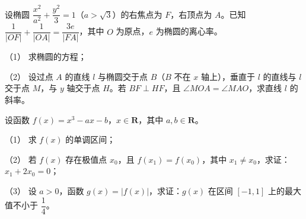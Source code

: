 \begin{question}
设椭圆 \(\dfrac{x^{2}}{a^{2}}+\dfrac{y^{2}}{3}=1\)（\(a>\sqrt{3}\)）的右焦点为 \(F\)，右顶点为 \(A\)。已知 \(\dfrac{1}{|OF|}+\dfrac{1}{|OA|}=\dfrac{3e}{|FA|}\)，其中 \(O\) 为原点，\(e\) 为椭圆的离心率。

（1） 求椭圆的方程；

（2） 设过点 \(A\) 的直线 \(l\) 与椭圆交于点 \(B\)（\(B\) 不在 \(x\) 轴上），垂直于 \(l\) 的直线与 \(l\) 交于点 \(M\)，与 \(y\) 轴交于点 \(H\)。若 \(BF\perp HF\)，且 \(\angle MOA=\angle MAO\)，求直线 \(l\) 的斜率。

\end{question}
\begin{question}
设函数 \(f(x)=x^{3}-ax-b\)，\(x\in\mathbf{R}\)，其中 \(a,b\in\mathbf{R}\)。

（1） 求 \(f(x)\) 的单调区间；

（2） 若 \(f(x)\) 存在极值点 \(x_{0}\)，且 \(f(x_{1})=f(x_{0})\)，其中 \(x_{1}\neq x_{0}\)，求证：\(x_{1}+2x_{0}=0\)；

（3） 设 \(a>0\)，函数 \(g(x)=|f(x)|\)，求证：\(g(x)\) 在区间 \([-1,1]\) 上的最大值不小于 \(\dfrac{1}{4}\)。

\end{question}